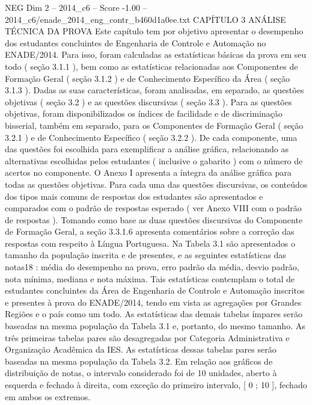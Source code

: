 \begin{textsample}{NEG Dim 2 – 2014\_c6 – Score -1.00 – 2014\_c6/enade\_2014\_eng\_contr\_b460d1a0ee.txt}  \label{ex:f2_neg_209}
CAPÍTULO 3 ANÁLISE TÉCNICA DA PROVA Este capítulo tem por objetivo apresentar o desempenho dos estudantes concluintes de Engenharia de Controle e Automação no ENADE/2014.
Para isso, foram calculadas as estatísticas básicas da prova em seu todo ( seção 3.1.1 ), bem como as estatísticas relacionadas aos Componentes de Formação Geral ( seção 3.1.2 ) e de Conhecimento Específico da Área ( seção 3.1.3 ).
Dadas as suas características, foram analisadas, em separado, as questões objetivas ( seção 3.2 ) e as questões discursivas ( seção 3.3 ).
Para as questões objetivas, foram disponibilizados os índices de facilidade e de discriminação bisserial, também em separado, para os Componentes de Formação Geral ( seção 3.2.1 ) e de Conhecimento Específico ( seção 3.2.2 ).
De cada componente, uma das questões foi escolhida para exemplificar a análise gráfica, relacionando as alternativas escolhidas pelos estudantes ( inclusive o gabarito ) com o número de acertos no componente.
O Anexo I apresenta a íntegra da análise gráfica para todas as questões objetivas.
Para cada uma das questões discursivas, os conteúdos dos tipos mais comuns de respostas dos estudantes são apresentados e comparados com o padrão de respostas esperado ( ver Anexo VIII com o padrão de respostas ).
Tomando como base as duas questões discursivas do Componente de Formação Geral, a seção 3.3.1.6 apresenta comentários sobre a correção das respostas com respeito à Língua Portuguesa.
Na Tabela 3.1 são apresentados o tamanho da população inscrita e de presentes, e as seguintes estatísticas das notas18 : média do desempenho na prova, erro padrão da média, desvio padrão, nota mínima, mediana e nota máxima.
Tais estatísticas contemplam o total de estudantes concluintes da Área de Engenharia de Controle e Automação inscritos e presentes à prova do ENADE/2014, tendo em vista as agregações por Grandes Regiões e o país como um todo.
As estatísticas das demais tabelas ímpares serão baseadas na mesma população da Tabela 3.1 e, portanto, do mesmo tamanho.
As três primeiras tabelas pares são desagregadas por Categoria Administrativa e Organização Acadêmica da IES.
As estatísticas dessas tabelas pares serão baseadas na mesma população da Tabela 3.2.
Em relação aos gráficos de distribuição de notas, o intervalo considerado foi de 10 unidades, aberto à esquerda e fechado à direita, com exceção do primeiro intervalo, [ 0 ; 10 ], fechado em ambos os extremos.

\end{textsample}
